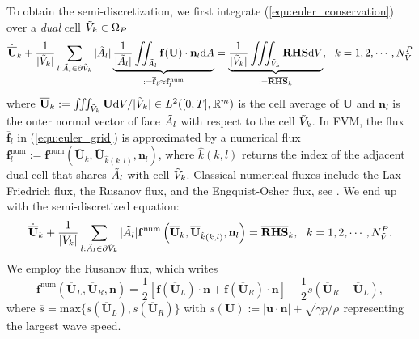 \documentclass{article}
\begin{document}
To obtain the semi-discretization, we first integrate (\ref{equ:euler_conservation}) over
a \emph{dual} cell $\Tilde{V}_k \in \Omega_P$
\begin{equation} \label{equ:euler_grid} 
    \dot{\overline{\mathbf{U}}}_k + \frac{1}{|\Tilde{V}_k|}\sum_{l:\Tilde{A}_l\in\partial \Tilde{V}_k} |\Tilde{A}_l|\underbrace{\frac{1}{|\Tilde{A}_l|}\iint_{\Tilde{A}_l}\mathbf{f}(\mathbf{U})\cdot \mathbf{n}_l \text{d}A}_{:= \overline{\mathbf{f}}_l \approx \mathbf{f}^\text{num}_l} = \underbrace{\frac{1}{|\Tilde{V}_k|}\iiint_{\Tilde{V}_k} \mathbf{RHS} \text{d}V}_{:= \overline{\mathbf{RHS}}_k},\ \ k = 1,2,\cdots,N_{\Tilde{V}}^P
\end{equation}
where
$\overline{\mathbf{U}}_k := \iiint_{\Tilde{V}_k} \mathbf{U} \text{d}V / |\Tilde{V}_k| \in
L^2([0,T],\mathbb{R}^m)$ is the cell average of $\mathbf{U}$ and $\mathbf{n}_l$ is the
outer normal vector of face $\Tilde{A}_l$ with respect to the cell $\Tilde{V}_k$. In FVM,
the flux $\overline{\mathbf{f}}_l$ in (\ref{equ:euler_grid}) is approximated by a
numerical flux
$\mathbf{f}^\text{num}_l := \mathbf{f}^\text{num}\left(\overline{\mathbf{U}}_k,
  \overline{\mathbf{U}}_{\hat{k}(k,l)}, \mathbf{n}_l\right)$, where $\hat{k}(k,l)$ returns
the index of the adjacent dual cell that shares $\Tilde{A}_l$ with cell
$\Tilde{V}_k$. Classical numerical fluxes include the Lax-Friedrich flux, the Rusanov
flux, and the Engquist-Osher flux, see \cite[][pp. 44-46]{mishra_2019}. We end up with the
semi-discretized equation:
\begin{equation}
  \dot{\overline{\mathbf{U}}}_k + \frac{1}{|V_k|}\sum_{l:\Tilde{A}_l\in\partial \Tilde{V}_k} |\Tilde{A}_l| \mathbf{f}^\text{num}\left(\overline{\mathbf{U}}_k, \overline{\mathbf{U}}_{\hat{k}(k,l)}, \mathbf{n}_l\right) = \overline{\mathbf{RHS}}_k,\ \  k = 1,2,\cdots,N_{\Tilde{V}}^P.
    \label{equ:fvm}
\end{equation}
We employ the Rusanov flux, which writes
\begin{equation} \label{equ:rusanov-flux-3d}
    \mathbf{f}^\text{num}\left(\overline{\mathbf{U}}_L, \overline{\mathbf{U}}_R, \mathbf{n}\right) = \frac{1}{2}\left[\mathbf{f}(\overline{\mathbf{U}}_L)\cdot\mathbf{n} + \mathbf{f}(\overline{\mathbf{U}}_R)\cdot\mathbf{n}\right] - \frac{1}{2}\overline{s}\left(\overline{\mathbf{U}}_R - \overline{\mathbf{U}}_L\right),  
\end{equation}
where $\overline{s} = \text{max}\{s(\overline{\mathbf{U}}_L), s(\overline{\mathbf{U}}_R)\}$ with $s(\mathbf{U}) := |\mathbf{u}\cdot\mathbf{n}| + \sqrt{\gamma p/\rho}$ representing the largest wave speed. 
\end{document}
